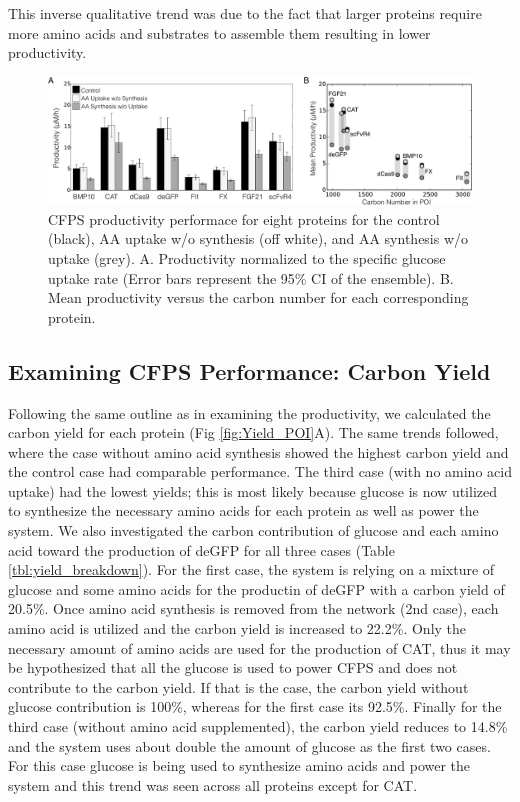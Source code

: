 \documentclass[journal=asbcd6,manuscript=article]{achemso}
\begin{document}
This inverse qualitative trend was due to the fact that larger proteins require more amino acids and substrates to assemble them resulting in lower productivity. 
\begin{figure}[t!]
\centering
\includegraphics[width=1.00\textwidth]{./Figures/Prod_POI.pdf}
\caption{CFPS productivity performace for eight proteins for the control (black), AA uptake w/o synthesis (off white), and AA synthesis w/o uptake (grey). A. Productivity normalized to the specific glucose uptake rate (Error bars represent the 95\% CI of the ensemble). B. Mean productivity versus the carbon number for each corresponding protein.}
\label{fig:Prod_POI}
\end{figure}

\subsection{Examining CFPS Performance: Carbon Yield}
Following the same outline as in examining the productivity, we calculated the carbon yield for each protein (Fig \ref{fig:Yield_POI}A). 
The same trends followed, where the case without amino acid synthesis showed the highest carbon yield and the control case had comparable performance. 
The third case (with no amino acid uptake) had the lowest yields; this is most likely because glucose is now utilized to synthesize the necessary amino acids for each protein as well as power the system. 
We also investigated the carbon contribution of glucose and each amino acid toward the production of deGFP for all three cases (Table \ref{tbl:yield_breakdown}).
For the first case, the system is relying on a mixture of glucose and some amino acids for the productin of deGFP with a carbon yield of 20.5\%.
Once amino acid synthesis is removed from the network (2nd case), each amino acid is utilized and the carbon yield is increased to 22.2\%.
Only the necessary amount of amino acids are used for the production of CAT, thus it may be hypothesized that all the glucose is used to power CFPS and does not contribute to the carbon yield. 
If that is the case, the carbon yield without glucose contribution is 100\%, whereas for the first case its 92.5\%.
Finally for the third case (without amino acid supplemented), the carbon yield reduces to 14.8\% and the system uses about double the amount of glucose as the first two cases. 
For this case glucose is being used to synthesize amino acids and power the system and this trend was seen across all proteins except for CAT.
\end{document}
